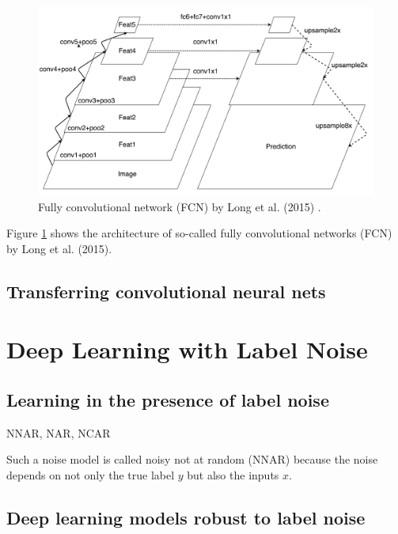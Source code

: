 
\begin{figure}[t]
\centering
   \includegraphics[width=\linewidth]{img/fcn}
\caption{Fully convolutional network (FCN) by Long et al. (2015) \cite{long2015fully}.}
\label{fig:fcn}
\end{figure}

Figure \ref{fig:fcn} shows the architecture of so-called fully convolutional networks (FCN) by Long et al. (2015).

\subsection{Transferring convolutional neural nets}


\section{Deep Learning with Label Noise}
\subsection{Learning in the presence of label noise}

NNAR, NAR, NCAR

Such a noise model is called noisy not at random (NNAR) \cite{frenay2014classification} because the noise depends on not only the true label $y$ but also the inputs $x$.

\subsection{Deep learning models robust to label noise}


